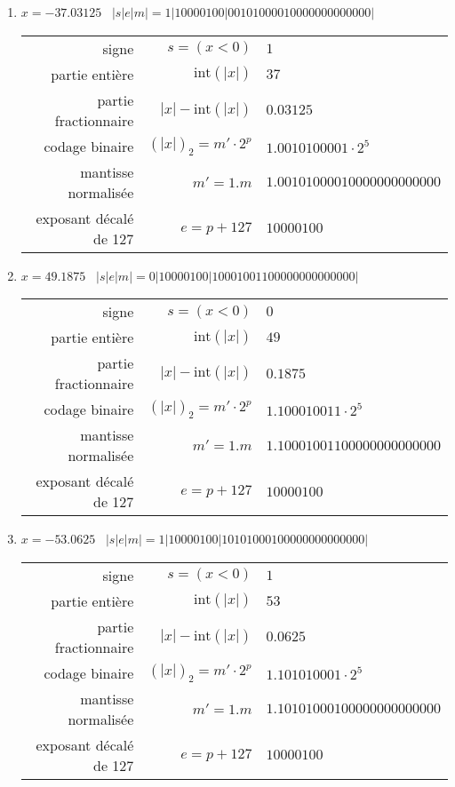\documentclass[11pt,a4paper]{article}
\begin{document}
\begin{enumerate}
\item $x = -37.03125$ \dotfill\ {$|s|e|m| = 1|10000100|00101000010000000000000|$}
{\footnotesize
\begin{tabular}{r@{ : }r@{ $=$ }l}
signe 					& $s = (x < 0)$ 			& $1$ \\
partie entière 			& $\mbox{int}(|x|)$ 		& $37$ \\
partie fractionnaire 	& $|x| - \mbox{int}(|x|)$ 	& $0.03125$ \\
codage binaire 			& $(|x|)_2 = m'\cdot 2^p$   & $1.0010100001 \cdot 2^{5}$ \\
mantisse normalisée 	& $m' = 1.m$ 				& $1.00101000010000000000000$ \\
exposant décalé de 127 	& $e = p+127$ 				& $10000100$ \\[2mm]
\end{tabular}
}

\item $x = 49.1875$ \dotfill\ {$|s|e|m| = 0|10000100|10001001100000000000000|$}
{\footnotesize
\begin{tabular}{r@{ : }r@{ $=$ }l}
signe 					& $s = (x < 0)$ 			& $0$ \\
partie entière 			& $\mbox{int}(|x|)$ 		& $49$ \\
partie fractionnaire 	& $|x| - \mbox{int}(|x|)$ 	& $0.1875$ \\
codage binaire 			& $(|x|)_2 = m'\cdot 2^p$   & $1.100010011 \cdot 2^{5}$ \\
mantisse normalisée 	& $m' = 1.m$ 				& $1.10001001100000000000000$ \\
exposant décalé de 127 	& $e = p+127$ 				& $10000100$ \\[2mm]
\end{tabular}
}

\item $x = -53.0625$ \dotfill\ {$|s|e|m| = 1|10000100|10101000100000000000000|$}
{\footnotesize
\begin{tabular}{r@{ : }r@{ $=$ }l}
signe 					& $s = (x < 0)$ 			& $1$ \\
partie entière 			& $\mbox{int}(|x|)$ 		& $53$ \\
partie fractionnaire 	& $|x| - \mbox{int}(|x|)$ 	& $0.0625$ \\
codage binaire 			& $(|x|)_2 = m'\cdot 2^p$   & $1.101010001 \cdot 2^{5}$ \\
mantisse normalisée 	& $m' = 1.m$ 				& $1.10101000100000000000000$ \\
exposant décalé de 127 	& $e = p+127$ 				& $10000100$ \\[2mm]
\end{tabular}
}


\end{enumerate}
\end{document}
